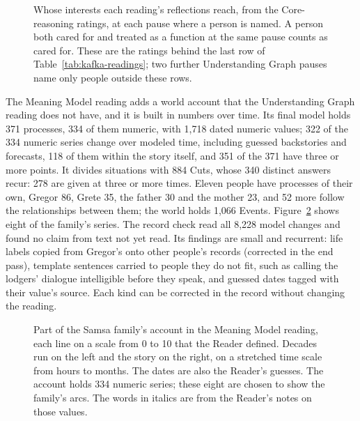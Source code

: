 \documentclass[11pt]{article}
\begin{document}
\begin{figure}[htb]
    \centering
    
        \caption{Whose interests each reading's reflections reach, from the Core-reasoning ratings, at each pause where a person is named. A person both cared for and treated as a function at the same pause counts as cared for. These are the ratings behind the last row of Table~\ref{tab:kafka-readings}; two further Understanding Graph pauses name only people outside these rows.}
    \label{fig:kafka-care}
\end{figure}

The Meaning Model reading adds a world account that the Understanding Graph
reading does not have, and it is built in numbers over time. Its final model
holds 371 processes, 334 of them numeric, with 1,718 dated numeric values; 322 of
the 334 numeric series change over modeled time, including guessed backstories
and forecasts, 118 of them within the story itself, and 351 of the 371 have
three or more points. It divides situations with 884 Cuts, whose 340 distinct
answers recur: 278 are given at three or more times. Eleven people have
processes of their own, Gregor 86, Grete 35, the father 30 and the mother 23,
and 52 more follow the relationships between them; the world holds 1,066 Events.
Figure~\ref{fig:kafka-family} shows eight of the family's series.
The record check read all 8,228 model changes and found no claim from text not
yet read. Its findings are small and recurrent: life labels copied from
Gregor's onto other people's records (corrected in the end pass), template
sentences carried to people they do not fit, such as calling the lodgers'
dialogue intelligible before they speak, and guessed dates tagged with their
value's source. Each kind can be corrected in the record without changing the
reading.

\begin{figure}[htb]
    \centering
    
    \caption{Part of the Samsa family's account in the Meaning Model reading, each line on a scale from 0 to 10 that the Reader defined. Decades run on the left and the story on the right, on a stretched time scale from hours to months. The dates are also the Reader's guesses. The account holds 334 numeric series; these eight are chosen to show the family's arcs. The words in italics are from the Reader's notes on those values.}
    \label{fig:kafka-family}
\end{figure}
\end{document}
